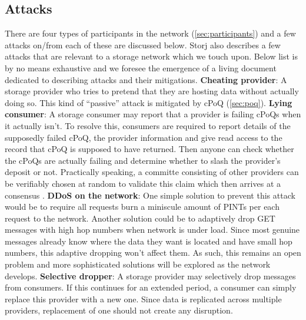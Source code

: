 \subsection{Attacks}
There are four types of participants in the network (\cref{sec:participants}) and a few attacks on/from each of these are discussed below. Storj \cite{Storj} also describes a few attacks that are relevant to a storage network which we touch upon. Below list is by no means exhaustive and we foresee the emergence of a living document dedicated to describing attacks and their mitigations.
\newline\newline
\textbf{Cheating provider}: A storage provider who tries to pretend that they are hosting data without actually doing so. This kind of ``passive'' attack is mitigated by \textsf{cPoQ} (\cref{sec:poq}).
\newline\newline
\textbf{Lying consumer}: A storage consumer may report that a provider is failing \textsf{cPoQ}s when it actually isn't. To resolve this, consumers are required to report details of the supposedly failed \textsf{cPoQ}, the provider information and give read access to the record that \textsf{cPoQ} is supposed to have returned. Then anyone can check whether the \textsf{cPoQ}s are actually failing and determine whether to slash the provider's deposit or not. Practically speaking, a committe consisting of other providers can be verifiably chosen at random to validate this claim which then arrives at a consensus \cite{algorand}. 
\newline\newline
\textbf{DDoS on the network}: One simple solution to prevent this attack would be to require all requests burn a miniscule amount of \textsf{PINT}s per each request to the network. Another solution could be to adaptively drop \textsf{GET} messages with high hop numbers when network is under load. Since most genuine messages already know where the data they want is located and have small hop numbers, this adaptive dropping won't affect them. As such, this remains an open problem and more sophisticated solutions will be explored as the network develops.
\newline\newline
\textbf{Selective dropper}: A storage provider may selectively drop messages from consumers. If this continues for an extended period, a consumer can simply replace this provider with a new one. Since data is replicated across multiple providers, replacement of one should not create any disruption.

